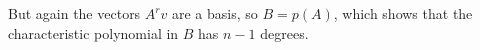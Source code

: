 But again the vectors $A^rv$ are a basis, so $B=p(A)$, which shows that the characteristic polynomial in $B$ has $n-1$ degrees. 
